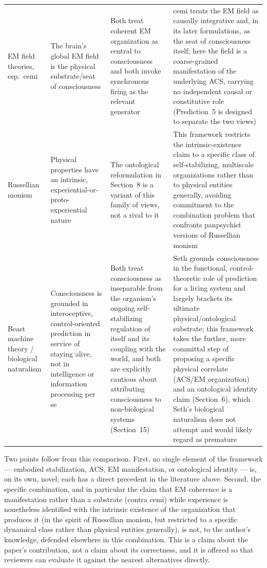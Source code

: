 \documentclass[11pt]{article}
\begin{document}
\begin{longtable}{p{2.7cm}p{3.1cm}p{3.9cm}p{4.3cm}}
EM field theories, esp.\ cemi \citep*{mcfadden2002a,mcfadden2002b,mcfadden2020} & The brain's global EM field is the physical substrate/seat of consciousness & Both treat coherent EM organization as central to consciousness and both invoke synchronous firing as the relevant generator & cemi treats the EM field as causally integrative and, in its later formulations, as the seat of consciousness itself; here the field is a coarse-grained manifestation of the underlying ACS, carrying no independent causal or constitutive role (Prediction~5 is designed to separate the two views) \\[4pt]
Russellian monism \citep*{strawson2006,chalmers2013} & Physical properties have an intrinsic, experiential-or-proto-experiential nature & The ontological reformulation in Section~8 is a variant of this family of views, not a rival to it & This framework restricts the intrinsic-existence claim to a specific class of self-stabilizing, multiscale organizations rather than to physical entities generally, avoiding commitment to the combination problem that confronts panpsychist versions of Russellian monism \\[4pt]
Beast machine theory / biological naturalism \citep*{seth2021a,seth2021b,sethbayne2022,seth2025} & Consciousness is grounded in interoceptive, control-oriented prediction in service of staying alive, not in intelligence or information processing per se & Both treat consciousness as inseparable from the organism's ongoing self-stabilizing regulation of itself and its coupling with the world, and both are explicitly cautious about attributing consciousness to non-biological systems (Section~15) & Seth grounds consciousness in the functional, control-theoretic role of prediction for a living system and largely brackets its ultimate physical/ontological substrate; this framework takes the further, more committal step of proposing a specific physical correlate (ACS/EM organization) and an ontological identity claim (Section~6), which Seth's biological naturalism \citep*{seth2025} does not attempt and would likely regard as premature \\
\bottomrule
\end{longtable}

Two points follow from this comparison. First, no single element of the framework --- embodied stabilization, ACS, EM manifestation, or ontological identity --- is, on its own, novel; each has a direct precedent in the literature above. Second, the specific combination, and in particular the claim that EM coherence is a manifestation rather than a substrate (contra cemi) while experience is nonetheless identified with the intrinsic existence of the organization that produces it (in the spirit of Russellian monism, but restricted to a specific dynamical class rather than physical entities generally), is not, to the author's knowledge, defended elsewhere in this combination. This is a claim about the paper's contribution, not a claim about its correctness, and it is offered so that reviewers can evaluate it against the nearest alternatives directly.
\end{document}
